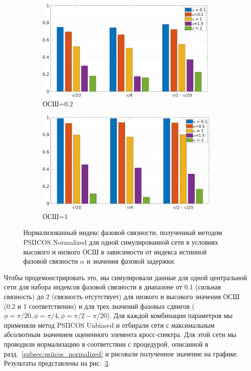 \begin{figure}[htbp]
    \begin{subfigure}[t]{0.5\textwidth}
        \includegraphics[width=0.99\textwidth]{../images/bars_snr_02.jpg}
        \caption{ОСШ=0.2}\label{fig:bars_a}
    \end{subfigure}
    \begin{subfigure}[t]{0.5\textwidth}
        \includegraphics[width=0.99\linewidth]{../images/bars_snr_1.jpg}
        \caption{ОСШ=1}\label{fig:bars_b}
    \end{subfigure}
    \caption{Нормализованный индекс фазовой связности, полученный методом
    PSIICOS Normalized для одной симулированной сети в условиях высокого и низкого ОСШ
    в зависимости от индекса истинной фазовой связности $\alpha$ и значения
    фазовой задержки.}\label{fig:bars_normalized_index}
\end{figure}

Чтобы продемонстрировать это, мы симулировали данные для одной центральной сети
для набора индексов фазовой связности в диапазоне от 0.1 (сильная связность) до
2 (связность отсутствует) для низкого и высокого значения ОСШ (0.2 и 1 соответственно)
и для трех значений фазовых сдвигов ($\phi=\pi/20, \phi = \pi/4, \phi=\pi/2 - \pi/20$).
Для каждой комбинации параметров мы применяли метод PSIICOS Unbiased и отбирали
сети с максимальным абсолютным значением оцененного элемента кросс-спектра.
Для этой сети мы проводили нормализацию в соответствии с процедурой, описанной
в разд.~\ref{subsec:psiicos_normalized} и рисовали полученное значение на графике.
Результаты представлены на рис.~\ref{fig:bars_normalized_index}.

